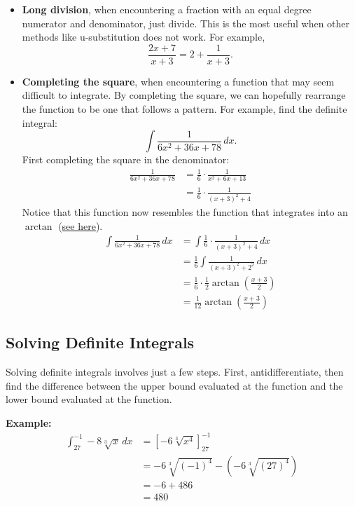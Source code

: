 \documentclass[12pt]{article}
\begin{document}
\begin{itemize}
	\item \textbf{Long division}, when encountering a fraction with an equal degree numerator and denominator, just divide. This is the most useful when other methods like u-substitution does not work. For example,
	      \[ \frac{2x+7}{x+3} = 2 + \frac{1}{x+3}. \]

	\item \textbf{Completing the square}, when encountering a function that may seem difficult to integrate. By completing the square, we can hopefully rearrange the function to be one that follows a pattern. For example, find the definite integral:
	      \[ \int \frac{1}{6x^2+36x+78} \, dx. \]
	      First completing the square in the denominator:
	      \begin{align*}
		      \frac{1}{6x^2+36x+78} & = \frac{1}{6} \cdot \frac{1}{x^2+6x+13}   \\[6pt]
		      & = \frac{1}{6} \cdot \frac{1}{(x+3)^2 + 4}
	      \end{align*}
	      Notice that this function now resembles the function that integrates into an $\arctan$ (\hyperref[sec:arctanintegral]{see here}).
	      \begin{align*}
		      \int \frac{1}{6x^2+36x+78} \, dx & = \int \frac{1}{6} \cdot \frac{1}{(x+3)^2 + 4} \, dx                 \\[6pt]
		      & = \frac{1}{6} \int \frac{1}{(x+3)^2 + 2^2} \, dx                     \\[6pt]
		      & = \frac{1}{6} \cdot \frac{1}{2} \arctan \left( \frac{x+3}{2} \right) \\[6pt]
		      & = \frac{1}{12} \arctan \left( \frac{x+3}{2} \right)
	      \end{align*}
\end{itemize}

\subsection{Solving Definite Integrals}
Solving definite integrals involves just a few steps. First, antidifferentiate, then find the difference between the upper bound evaluated at the function and the lower bound evaluated at the function.

\noindent \textbf{Example:}
\begin{align*}
	\int_{27}^{-1} -8 \sqrt[3]{x} \, dx & = \left[ -6 \sqrt[3]{x^4} \right]_{27}^{-1}                \\
	& = -6 \sqrt[3]{(-1)^4} - \left( -6 \sqrt[3]{(27)^4} \right) \\
	& = -6 + 486                                                 \\
	& = 480
\end{align*}
\end{document}
